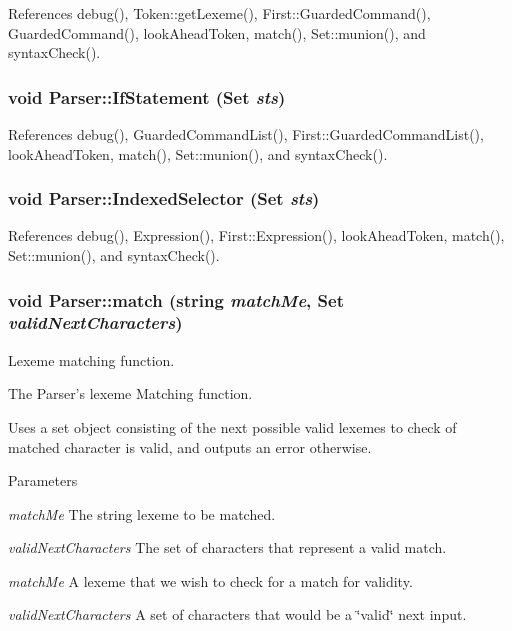 References debug(), Token::getLexeme(), First::GuardedCommand(), GuardedCommand(), lookAheadToken, match(), Set::munion(), and syntaxCheck().

\hypertarget{classParser_af7ef9a71f5e821040a16974c4602e23e}{
\subsubsection[{IfStatement}]{\setlength{\rightskip}{0pt plus 5cm}void Parser::IfStatement ({\bf Set} {\em sts})}}
\label{classParser_af7ef9a71f5e821040a16974c4602e23e}


References debug(), GuardedCommandList(), First::GuardedCommandList(), lookAheadToken, match(), Set::munion(), and syntaxCheck().

\hypertarget{classParser_ae6fd008bc26a87fbfe39d41a7391c01a}{
\subsubsection[{IndexedSelector}]{\setlength{\rightskip}{0pt plus 5cm}void Parser::IndexedSelector ({\bf Set} {\em sts})}}
\label{classParser_ae6fd008bc26a87fbfe39d41a7391c01a}


References debug(), Expression(), First::Expression(), lookAheadToken, match(), Set::munion(), and syntaxCheck().

\hypertarget{classParser_afd75ba38a886da3930c4a29f5d353a62}{
\subsubsection[{match}]{\setlength{\rightskip}{0pt plus 5cm}void Parser::match (string {\em matchMe}, \/  {\bf Set} {\em validNextCharacters})}}
\label{classParser_afd75ba38a886da3930c4a29f5d353a62}


Lexeme matching function. 

The Parser's lexeme Matching function.

Uses a set object consisting of the next possible valid lexemes to check of matched character is valid, and outputs an error otherwise. 
\begin{DoxyParams}{Parameters}
\item[{\em matchMe}]The string lexeme to be matched. \item[{\em validNextCharacters}]The set of characters that represent a valid match.\item[{\em matchMe}]A lexeme that we wish to check for a match for validity. \item[{\em validNextCharacters}]A set of characters that would be a \char`\"{}valid\char`\"{} next input. \end{DoxyParams}


